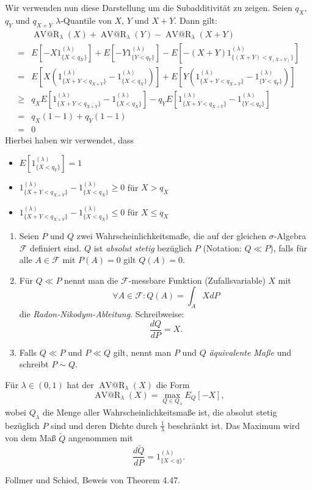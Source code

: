 \documentclass[a4paper,twoside,DIV15,BCOR12mm]{scrbook}
\makeatletter
\newcommand{\cF}{\mathcal F}
\DeclareMathOperator{\AVatR}{AV@R}
\makeatother
\begin{document}
\begin{beweis}
Wir verwenden nun diese Darstellung um die Subadditivität zu zeigen. Seien $q_X$, $q_Y$ und $q_{X+Y}$ $\lambda$-Quantile von $X$, $Y$ und $X+Y$. Dann gilt:
\begin{align*}
&\AVatR_\lambda(X) + \AVatR_\lambda(Y) - \AVatR_\lambda(X+Y) \\
=&E[-X 1_{\{X<q_X\}}^{(\lambda)}] + E[-Y 1_{\{Y<q_Y\}}^{(\lambda)}] - E[-(X+Y) 1_{\{(X+Y)<q_{(X+Y)}\}}^{(\lambda)}]\\
=&E[X(1_{\{X+Y<q_{X+Y}\}}^{(\lambda)} - 1_{\{X<q_X\}}^{(\lambda)})]
+ E[Y(1_{\{X+Y<q_{X+Y}\}}^{(\lambda)} - 1_{\{Y<q_Y\}}^{(\lambda)})] \\
\ge& q_X E[1_{\{X+Y<q_{X+Y}\}}^{(\lambda)} - 1_{\{X<q_X\}}^{(\lambda)}]
- q_Y E[1_{\{X+Y<q_{X+Y}\}}^{(\lambda)} - 1_{\{Y<q_Y\}}^{(\lambda)}] \\
=& q_X(1-1) + q_Y(1-1)\\
=& 0
\end{align*}
Hierbei haben wir verwendet, dass
\begin{itemize}
\item $E[1_{\{X<q_Y\}}^{(\lambda)}] = 1$ 
\item $1_{\{X+Y<q_{X+Y}\}}^{(\lambda)} - 1_{\{X<q_X\}}^{(\lambda)} \ge 0$ für $X>q_X$
\item $1_{\{X+Y<q_{X+Y}\}}^{(\lambda)} - 1_{\{X<q_X\}}^{(\lambda)} \le 0$ für $X\le q_X$
\end{itemize}
\end{beweis}

\begin{bemerkung}
\begin{enumerate}
\item Seien $P$ und $Q$ zwei Wahrscheinlichkeitsmaße, die auf der gleichen $\sigma$-Algebra $\cF$ definiert sind. $Q$ ist \emph{absolut stetig} bezüglich $P$ (Notation: $Q\ll P$), falls für alle $A\in\cF$ mit $P(A)=0$ gilt $Q(A)=0$.
\item Für $Q\ll P$ nennt man die $\cF$-messbare Funktion (Zufallsvariable) $X$ mit 
\[
\forall A\in\cF: Q(A) = \int_A X dP
\]
die \emph{Radon-Nikodym-Ableitung}. Schreibweise:
\[
\frac{dQ}{dP} = X.
\]
\item Falls $Q\ll P$ und $P\ll Q$ gilt, nennt man $P$ und $Q$ \emph{äquivalente Maße} und schreibt $P\sim Q$.
\end{enumerate}
\end{bemerkung}

\begin{satz}
Für $\lambda\in(0, 1)$ hat der $\AVatR_\lambda(X)$ die Form
\[
\AVatR_\lambda(X) = \max_{Q\in Q_\lambda}E_Q[-X],
\]
wobei $Q_\lambda$ die Menge aller Wahrscheinlichkeitsmaße ist, die absolut stetig bezüglich $P$ sind und deren Dichte durch $\frac1\lambda$ beschränkt ist. Das Maximum wird von dem Maß $\tilde Q$ angenommen mit
\[
\frac{d\tilde Q}{dP} = 1_{\{X<q\}}^{(\lambda)}.
\]
\end{satz}
\begin{beweis}
Follmer und Schied, Beweis von Theorem 4.47.
\end{beweis}
\end{document}
